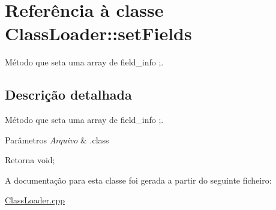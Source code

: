 \hypertarget{class_class_loader_1_1set_fields}{}\section{Referência à classe Class\+Loader\+:\+:set\+Fields}
\label{class_class_loader_1_1set_fields}


Método que seta uma array de field\+\_\+info ;.  




\subsection{Descrição detalhada}
Método que seta uma array de field\+\_\+info ;. 


\begin{DoxyParams}{Parâmetros}
{\em Arquivo} & .class \\
\hline
\end{DoxyParams}
\begin{DoxyReturn}{Retorna}
void; 
\end{DoxyReturn}


A documentação para esta classe foi gerada a partir do seguinte ficheiro\+:\begin{DoxyCompactItemize}
\item 
\hyperlink{_class_loader_8cpp}{Class\+Loader.\+cpp}\end{DoxyCompactItemize}
